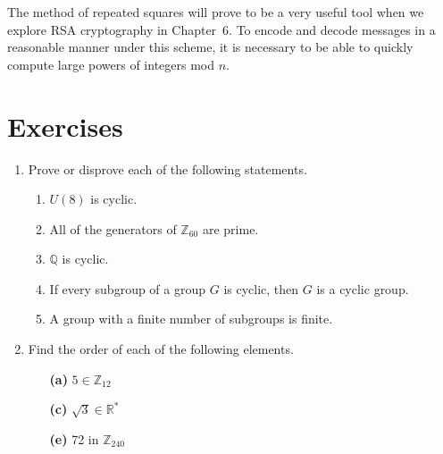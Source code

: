  
The method of repeated squares will prove to be a very useful tool
when we explore  RSA cryptography  in Chapter~6. To encode and decode
messages in a reasonable manner under this scheme, it is necessary to
be able to quickly compute large powers of integers mod $n$.
 
 
\section*{Exercises}
\exrule
 
 
 
 
{\small
\begin{enumerate}
 
 
\bf\item\rm
Prove or disprove each of the following statements.
\begin{enumerate}
 
 \bf\item\rm
$U(8)$ is cyclic.
 
 \bf\item\rm
All of the generators of ${\mathbb Z}_{60}$ are prime.
 
 \bf\item\rm
${\mathbb Q}$ is cyclic.
 
 \bf\item\rm
If every subgroup of a group $G$ is cyclic, then $G$ is a cyclic
group. 
 
 \bf\item\rm
A group with a finite number of subgroups is finite.
 
\end{enumerate}
 
 
\bf\item\rm
Find the order of each of the following elements.
 
 
\vspace{3pt}        %
 
\hspace{-7pt}
\begin{minipage}[t]{4.6in}
\noindent
\begin{minipage}[t]{2.25in}
\begin{itemize}
 
 \item[{\bf (a)}]
$5 \in {\mathbb Z}_{12}$
 
 \item[{\bf (c)}]
$\sqrt{3} \in {\mathbb R}^\ast$
 
 \item[{\bf (e)}]
72 in ${\mathbb Z}_{240}$
 

\end{itemize}
\end{minipage}
\end{minipage}
\end{enumerate}}
